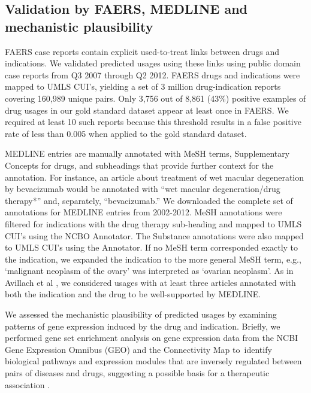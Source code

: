 \subsection{Validation by FAERS, MEDLINE and mechanistic plausibility}
FAERS case reports contain explicit used-to-treat links between drugs
and indications.  We validated predicted usages using these links
using public domain case reports from Q3 2007 through Q2 2012.  FAERS
drugs and indications were mapped to UMLS CUI’s, yielding a set of 3
million drug-indication reports covering 160,989 unique pairs.  Only
3,756 out of 8,861 (43\%) positive examples of drug usages in our gold
standard dataset appear at least once in FAERS.  We required at least
10 such reports because this threshold results in a false positive
rate of less than 0.005 when applied to the gold standard dataset.

MEDLINE entries are manually annotated with MeSH terms, Supplementary
Concepts for drugs, and subheadings that provide further context for
the annotation.  For instance, an article about treatment of wet
macular degeneration by bevacizumab would be annotated with “wet
macular degeneration/drug therapy*” and, separately, “bevacizumab.”
We downloaded the complete set of annotations for MEDLINE entries from
2002-2012.  MeSH annotations were filtered for indications with the
drug therapy sub-heading and mapped to UMLS CUI’s using the NCBO
Annotator.  The Substance annotations were also mapped to UMLS CUI’s
using the Annotator.  If no MeSH term corresponded exactly to the
indication, we expanded the indication to the more general MeSH term,
e.g., ‘malignant neoplasm of the ovary’ was interpreted as ‘ovarian
neoplasm’.  As in Avillach et al \cite{Avillach2013}, we considered
usages with at least three articles annotated with both the indication
and the drug to be well-supported by MEDLINE.

We assessed the mechanistic plausibility of predicted usages by
examining patterns of gene expression induced by the drug and
indication.  Briefly, we performed gene set enrichment analysis on
gene expression data from the NCBI Gene Expression Omnibus (GEO)
\cite{Edgar2002} and the Connectivity Map \cite{Lamb2006} to identify
biological pathways and expression modules that are inversely
regulated between pairs of diseases and drugs, suggesting a possible
basis for a therapeutic association \cite{Sirota2011}.  

